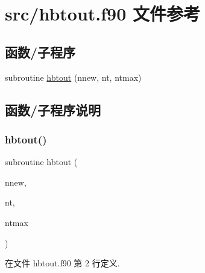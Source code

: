 \hypertarget{hbtout_8f90}{}\section{src/hbtout.f90 文件参考}
\label{hbtout_8f90}
\subsection*{函数/子程序}
\begin{DoxyCompactItemize}
\item 
subroutine \mbox{\hyperlink{hbtout_8f90_a872f8247d4137cfd3719c650292295fd}{hbtout}} (nnew, nt, ntmax)
\end{DoxyCompactItemize}


\subsection{函数/子程序说明}
\mbox{\label{hbtout_8f90_a872f8247d4137cfd3719c650292295fd}} 
\subsubsection{\texorpdfstring{hbtout()}{hbtout()}}
{\footnotesize\ttfamily subroutine hbtout (\begin{DoxyParamCaption}\item[{}]{nnew,  }\item[{}]{nt,  }\item[{}]{ntmax }\end{DoxyParamCaption})}



在文件 hbtout.\+f90 第 2 行定义.

